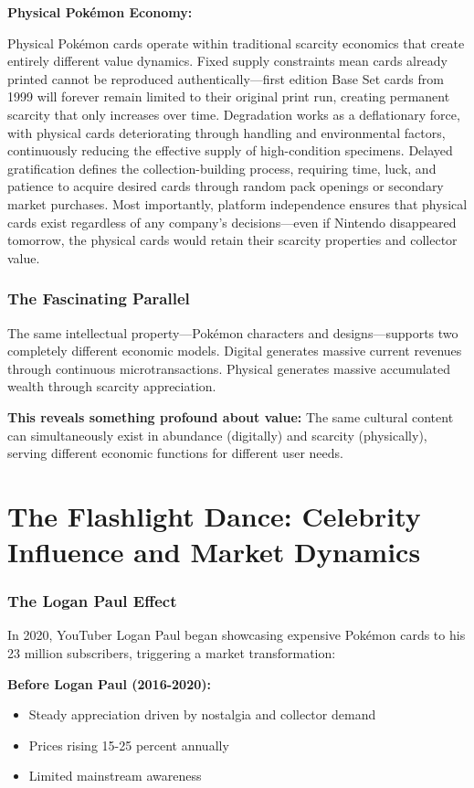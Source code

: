 \documentclass[11pt,oneside]{book}
\begin{document}
{{{{{{\textbf{Physical Pokémon Economy:}

Physical Pokémon cards operate within traditional scarcity economics that create entirely different value dynamics. Fixed supply constraints mean cards already printed cannot be reproduced authentically—first edition Base Set cards from 1999 will forever remain limited to their original print run, creating permanent scarcity that only increases over time. Degradation works as a deflationary force, with physical cards deteriorating through handling and environmental factors, continuously reducing the effective supply of high-condition specimens. Delayed gratification defines the collection-building process, requiring time, luck, and patience to acquire desired cards through random pack openings or secondary market purchases. Most importantly, platform independence ensures that physical cards exist regardless of any company's decisions—even if Nintendo disappeared tomorrow, the physical cards would retain their scarcity properties and collector value.

\subsubsection{The Fascinating Parallel}

The same intellectual property—Pokémon characters and designs—supports two completely different economic models. Digital generates massive current revenues through continuous microtransactions. Physical generates massive accumulated wealth through scarcity appreciation.

\textbf{This reveals something profound about value:} The same cultural content can simultaneously exist in abundance (digitally) and scarcity (physically), serving different economic functions for different user needs.

\section{The Flashlight Dance: Celebrity Influence and Market Dynamics}

\subsubsection{The Logan Paul Effect}

In 2020, YouTuber Logan Paul began showcasing expensive Pokémon cards to his 23 million subscribers, triggering a market transformation:

\textbf{Before Logan Paul (2016-2020):}
\begin{itemize}
\item Steady appreciation driven by nostalgia and collector demand
\item Prices rising 15-25 percent annually
\item Limited mainstream awareness
\end{itemize}

}}}}}}
\end{document}
